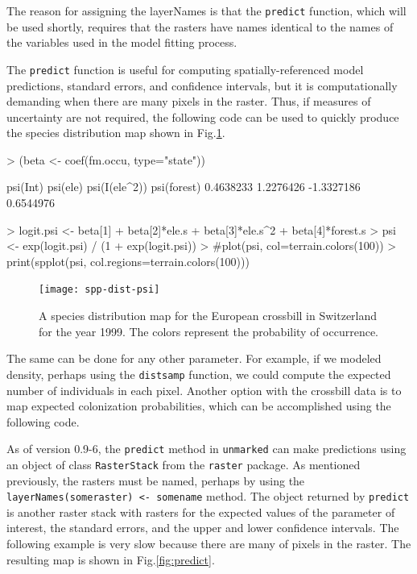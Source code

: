 \documentclass[a4paper]{article}
\renewenvironment{Schunk}{\vspace{\topsep}}{\vspace{\topsep}}
\begin{document}
The reason for assigning the layerNames is that the
\verb+predict+ function, which will be used shortly, requires that the
rasters have names identical to the names of the variables used in
the model fitting process.

The \verb+predict+ function is useful for computing
spatially-referenced model predictions, standard errors, and
confidence intervals, but it is computationally demanding when
there are many pixels in the raster. Thus, if measures of uncertainty
are not
required, the following code can be used to quickly produce the species
distribution map shown in Fig.\ref{fig:psi1}.

\begin{Schunk}
\begin{Sinput}
> (beta <- coef(fm.occu, type="state"))
\end{Sinput}
\begin{Soutput}
     psi(Int)      psi(ele) psi(I(ele^2))   psi(forest) 
    0.4638233     1.2276426    -1.3327186     0.6544976 
\end{Soutput}
\begin{Sinput}
> logit.psi <- beta[1] + beta[2]*ele.s + beta[3]*ele.s^2 + beta[4]*forest.s
> psi <- exp(logit.psi) / (1 + exp(logit.psi))
> #plot(psi, col=terrain.colors(100))
> print(spplot(psi, col.regions=terrain.colors(100)))
\end{Sinput}
\end{Schunk}

\begin{figure}
  \texttt{[image: spp-dist-psi]}
  \caption{A species distribution map for the European crossbill in
    Switzerland for the year 1999. The colors represent the probability
    of occurrence.}
\label{fig:psi1}
\end{figure}

The same can be done for any other parameter. For example, if we
modeled density, perhaps using the \verb+distsamp+ function, we could
compute the expected number of individuals in each pixel. Another
option with the crossbill data is to map expected colonization
probabilities, which can be accomplished using the following code.


As of version 0.9-6, the \verb+predict+ method in \texttt{unmarked}
can make predictions using an object of class \verb+RasterStack+ from the
\texttt{raster} package. As mentioned previously, the rasters must be
named, perhaps by using the \verb+layerNames(someraster) <- somename+
method. The object
returned by \verb+predict+ is another raster stack with rasters for
the expected values of the parameter of interest, the standard errors,
and the upper and lower confidence intervals. The following example
is very slow because there are many of pixels in the raster. The
resulting map is shown in Fig.\ref{fig:predict}.
\end{document}
